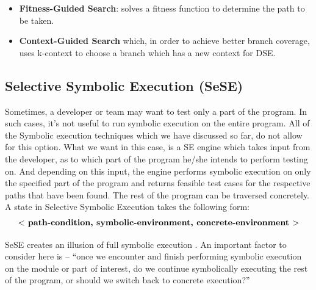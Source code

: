 \documentclass[11pt]{llncs}
\begin{document}
\begin{enumerate}
\begin{enumerate}
\begin{itemize}
					\item \textbf{Fitness-Guided Search}: solves a fitness function to determine the path to be taken.
					\item \textbf{Context-Guided Search} which, in order to achieve better branch coverage, uses k-context to choose a branch which has a new context for DSE.
				\end{itemize}
			\end{enumerate}
		\end{enumerate}

		
	\subsection{Selective Symbolic Execution (SeSE)}
		Sometimes, a developer or team may want to test only a part of the program. In such cases, it’s not useful to run symbolic execution on the entire program. All of the Symbolic execution techniques which we have discussed so far, do not allow for this option. What we want in this case, is a SE engine which takes input from the developer, as to which part of the program he/she intends to perform testing on. \cite{2_Survey_SE} And depending on this input, the engine performs symbolic execution on only the specified part of the program and returns feasible test cases for the respective paths that have been found. The rest of the program can be traversed concretely.\cite{3_SeSE}\\
	
		A state in Selective Symbolic Execution takes the following form:
		\begin{equation}
			\textbf{$ < $ path-condition, symbolic-environment, concrete-environment $ > $}
		\end{equation}

		SeSE creates an illusion of full symbolic execution \cite{3_SeSE}. An important factor to consider here is – “once we encounter and finish performing symbolic execution on the module or part of interest, do we continue symbolically executing the rest of the program, or should we switch back to concrete execution?”
\end{document}
